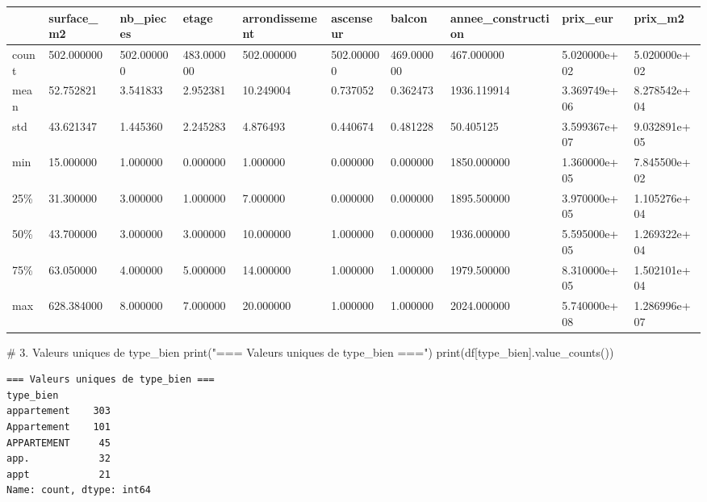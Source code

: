 \documentclass[
  french,
  11pt,
  a4paper,
]{scrbook}
\newenvironment{Shaded}{}{}
\newcommand{\BuiltInTok}[1]{\textcolor[rgb]{0.84,0.23,0.29}{#1}}
\newcommand{\CommentTok}[1]{\textcolor[rgb]{0.42,0.45,0.49}{#1}}
\newcommand{\NormalTok}[1]{\textcolor[rgb]{0.14,0.16,0.18}{#1}}
\newcommand{\StringTok}[1]{\textcolor[rgb]{0.01,0.18,0.38}{#1}}
\newcounter{none} %
\begin{document}
\begin{tcolorbox}
{\def\LTcaptype{none} %
\begin{longtable}[]{@{}llllllllll@{}}
\toprule\noalign{}
& surface\_m2 & nb\_pieces & etage & arrondissement & ascenseur & balcon
& annee\_construction & prix\_eur & prix\_m2 \\
\midrule\noalign{}
\endhead
\bottomrule\noalign{}
\endlastfoot
count & 502.000000 & 502.000000 & 483.000000 & 502.000000 & 502.000000 &
469.000000 & 467.000000 & 5.020000e+02 & 5.020000e+02 \\
mean & 52.752821 & 3.541833 & 2.952381 & 10.249004 & 0.737052 & 0.362473
& 1936.119914 & 3.369749e+06 & 8.278542e+04 \\
std & 43.621347 & 1.445360 & 2.245283 & 4.876493 & 0.440674 & 0.481228 &
50.405125 & 3.599367e+07 & 9.032891e+05 \\
min & 15.000000 & 1.000000 & 0.000000 & 1.000000 & 0.000000 & 0.000000 &
1850.000000 & 1.360000e+05 & 7.845500e+02 \\
25\% & 31.300000 & 3.000000 & 1.000000 & 7.000000 & 0.000000 & 0.000000
& 1895.500000 & 3.970000e+05 & 1.105276e+04 \\
50\% & 43.700000 & 3.000000 & 3.000000 & 10.000000 & 1.000000 & 0.000000
& 1936.000000 & 5.595000e+05 & 1.269322e+04 \\
75\% & 63.050000 & 4.000000 & 5.000000 & 14.000000 & 1.000000 & 1.000000
& 1979.500000 & 8.310000e+05 & 1.502101e+04 \\
max & 628.384000 & 8.000000 & 7.000000 & 20.000000 & 1.000000 & 1.000000
& 2024.000000 & 5.740000e+08 & 1.286996e+07 \\
\end{longtable}
}

\begin{Shaded}
\begin{Highlighting}[]
\CommentTok{\# 3. Valeurs uniques de type\_bien}
\BuiltInTok{print}\NormalTok{(}\StringTok{"=== Valeurs uniques de type\_bien ==="}\NormalTok{)}
\BuiltInTok{print}\NormalTok{(df[}\StringTok{\textquotesingle{}type\_bien\textquotesingle{}}\NormalTok{].value\_counts())}
\end{Highlighting}
\end{Shaded}

\begin{verbatim}
=== Valeurs uniques de type_bien ===
type_bien
appartement    303
Appartement    101
APPARTEMENT     45
app.            32
appt            21
Name: count, dtype: int64
\end{verbatim}


\end{tcolorbox}
\end{document}
